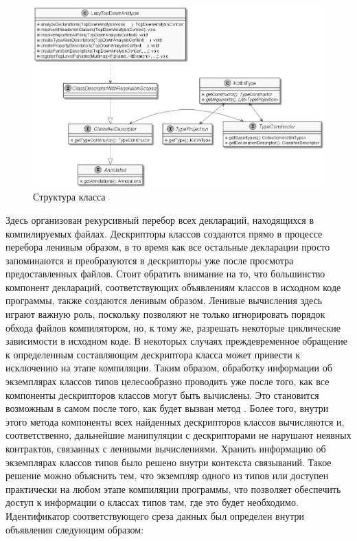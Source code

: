 \begin{figure}[htbp]
    \centering
    \includegraphics[width=\textwidth]{resources/06/12_class_descriptor.png}
    \caption{Структура класса }
    \label{fig:lazy-top-down-analyzer}
\end{figure}

Здесь организован рекурсивный перебор всех деклараций, находящихся в компилируемых файлах. Дескрипторы классов создаются прямо в процессе перебора ленивым образом, в то время как все остальные декларации просто запоминаются и преобразуются в дескрипторы уже после просмотра предоставленных файлов. Стоит обратить внимание на то, что большинство компонент деклараций, соответствующих объявлениям классов в исходном коде программы, также создаются ленивым образом. Ленивые вычисления здесь играют важную роль, поскольку позволяют не только игнорировать порядок обхода файлов компилятором, но, к тому же, разрешать некоторые циклические зависимости в исходном коде. В некоторых случаях преждевременное обращение к определенным составляющим дескриптора класса может привести к исключению на этапе компиляции. Таким образом, обработку информации об экземплярах классов типов целесообразно проводить уже после того, как все компоненты дескрипторов классов могут быть вычислены. Это становится возможным в самом  после того, как будет вызван метод . Более того, внутри этого метода компоненты всех найденных дескрипторов классов вычисляются и, соответственно, дальнейшие манипуляции с дескрипторами не нарушают неявных контрактов, связанных с ленивыми вычислениями. Хранить информацию об экземплярах классов типов было решено внутри контекста связываний. Такое решение можно объяснить тем, что экземпляр одного из типов  или  доступен практически на любом этапе компиляции программы, что позволяет обеспечить доступ к информации о классах типов там, где это будет необходимо. Идентификатор соответствующего среза данных был определен внутри объявления  следующим образом:

